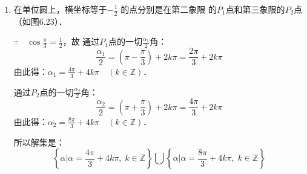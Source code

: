 \begin{solution}
\begin{enumerate}
所以$\sin2\alpha=-\frac{\sqrt{3}}{2}$的解集是
\[\left\{\alpha\Big|\alpha=\frac{2\pi}{3}+k\pi,\; k\in\mathbb{Z}\right\}\bigcup \left\{\alpha\Big|\alpha=\frac{5\pi}{6}+k\pi,\; k\in\mathbb{Z}\right\}\]

\textbf{另解：}
$\because\quad \sin2\alpha=-\frac{\sqrt{3}}{2}<0$

$\therefore\quad$角$ 2\alpha$终边在第三或第四象
限．

$\because\quad \sin\frac{\pi}{3}=\frac{\sqrt{3}}{2}$，
根据诱导公式
\[\sin\left[\left(\pi+\frac{\pi}{3}\right)+2k\pi\right]=\sin\left[\left(2\pi-\frac{\pi}{3}\right)+2k\pi\right]=-\sin\frac{\pi}{3}=-\frac{\sqrt{3}}{2}\]
得知
\[2\alpha=\frac{4\pi}{3}+2k\pi\qquad \text{或}\qquad 2\alpha=\frac{5\pi}{3}+2k\pi\quad (k\in\mathbb{Z})\]
$\therefore\quad \alpha=\frac{2\pi}{3}+k\pi\qquad \text{或}\qquad \alpha=\frac{5\pi}{6}+k\pi\quad (k\in\mathbb{Z})$

\item 在单位圆上，横坐标等于$-\frac{1}{2}$
的点分别是在第二象限
的$P_1$点和第三象限的$P_2$点（如图6.23）．

\begin{figure}[htp]
    \centering
{}
    \caption{}
\end{figure}


$\because\quad \cos\frac{\pi}{3}=\frac{1}{2}$，故
通过$P_1$点的一切$\frac{\alpha_1}{2}$角：
\[\frac{\alpha_1}{2}=\left(\pi-\frac{\pi}{3}\right)+2k\pi=\frac{2\pi}{3}+2k\pi\]
由此得：$\alpha_1=\frac{4\pi}{3}+4k\pi\quad (k\in\mathbb{Z})$．

通过$P_2$点的一切$\frac{\alpha_2}{2}$角：
\[\frac{\alpha_2}{2}=\left(\pi+\frac{\pi}{3}\right)+2k\pi=\frac{4\pi}{3}+2k\pi\]
由此得：$\alpha_2=\frac{8\pi}{3}+4k\pi\quad (k\in\mathbb{Z})$．

所以解集是：
\[\left\{\alpha\Big|\alpha=\frac{4\pi}{3}+4k\pi,\; k\in\mathbb{Z}\right\}\bigcup \left\{\alpha\Big|\alpha=\frac{8\pi}{3}+4k\pi,\; k\in\mathbb{Z}\right\}\]


\end{enumerate}
\end{solution}
